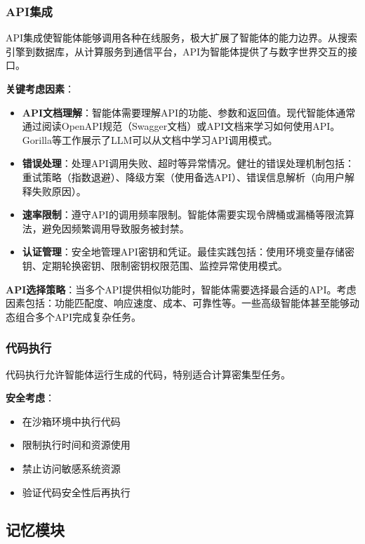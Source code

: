 \subsubsection{API集成}

API集成使智能体能够调用各种在线服务，极大扩展了智能体的能力边界。从搜索引擎到数据库，从计算服务到通信平台，API为智能体提供了与数字世界交互的接口。

\textbf{关键考虑因素}：
\begin{itemize}[leftmargin=2em]
    \item \textbf{API文档理解}：智能体需要理解API的功能、参数和返回值。现代智能体通常通过阅读OpenAPI规范（Swagger文档）或API文档来学习如何使用API。Gorilla等工作展示了LLM可以从文档中学习API调用模式。
    
    \item \textbf{错误处理}：处理API调用失败、超时等异常情况。健壮的错误处理机制包括：重试策略（指数退避）、降级方案（使用备选API）、错误信息解析（向用户解释失败原因）。
    
    \item \textbf{速率限制}：遵守API的调用频率限制。智能体需要实现令牌桶或漏桶等限流算法，避免因频繁调用导致服务被封禁。
    
    \item \textbf{认证管理}：安全地管理API密钥和凭证。最佳实践包括：使用环境变量存储密钥、定期轮换密钥、限制密钥权限范围、监控异常使用模式。
\end{itemize}

\textbf{API选择策略}：当多个API提供相似功能时，智能体需要选择最合适的API。考虑因素包括：功能匹配度、响应速度、成本、可靠性等。一些高级智能体甚至能够动态组合多个API完成复杂任务。

\subsubsection{代码执行}

代码执行允许智能体运行生成的代码，特别适合计算密集型任务。

\textbf{安全考虑}：
\begin{itemize}[leftmargin=2em]
    \item 在沙箱环境中执行代码
    \item 限制执行时间和资源使用
    \item 禁止访问敏感系统资源
    \item 验证代码安全性后再执行
\end{itemize}

\subsection{记忆模块}

